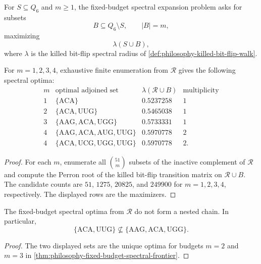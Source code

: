 \begin{definition}
\label{def:philosophy-fixed-budget-spectral-expansion}
For $S\subseteq Q_{6}$ and $m\geq 1$, the fixed-budget spectral
expansion problem asks for subsets
$$
  B\subseteq Q_{6}\setminus S,\qquad |B|=m,
$$
maximizing
$$
  \lambda(S\cup B),
$$
where $\lambda$ is the killed bit-flip spectral radius of
\autoref{def:philosophy-killed-bit-flip-walk}.
\end{definition}

\begin{theorem}
\label{thm:philosophy-fixed-budget-spectral-frontier}
For $m=1,2,3,4$, exhaustive finite enumeration from $\mathcal{R}$ gives
the following spectral optima:
$$
\begin{array}{c|l|r|r}
  m & \text{optimal adjoined set} & \lambda(\mathcal{R}\cup B) & \text{multiplicity}\\
  \hline
  1 & \{\mathrm{ACA}\} & 0.5237258 & 1\\
  2 & \{\mathrm{ACA},\mathrm{UUG}\} & 0.5465038 & 1\\
  3 & \{\mathrm{AAG},\mathrm{ACA},\mathrm{UGG}\} & 0.5733331 & 1\\
  4 & \{\mathrm{AAG},\mathrm{ACA},\mathrm{AUG},\mathrm{UUG}\} & 0.5970778 & 2\\
  4 & \{\mathrm{ACA},\mathrm{UCG},\mathrm{UGG},\mathrm{UUG}\} & 0.5970778 & 2.
\end{array}
$$
\end{theorem}
\begin{proof}
For each $m$, enumerate all $\binom{51}{m}$ subsets of the inactive
complement of $\mathcal{R}$ and compute the Perron root of the killed
bit-flip transition matrix on $\mathcal{R}\cup B$. The candidate counts
are $51$, $1275$, $20825$, and $249900$ for $m=1,2,3,4$, respectively.
The displayed rows are the maximizers.
\end{proof}

\begin{corollary}
\label{cor:philosophy-fixed-budget-non-nesting}
The fixed-budget spectral optima from $\mathcal{R}$ do not form a
nested chain. In particular,
$$
  \{\mathrm{ACA},\mathrm{UUG}\}
  \nsubseteq
  \{\mathrm{AAG},\mathrm{ACA},\mathrm{UGG}\}.
$$
\end{corollary}
\begin{proof}
The two displayed sets are the unique optima for budgets $m=2$ and
$m=3$ in \autoref{thm:philosophy-fixed-budget-spectral-frontier}.
\end{proof}


